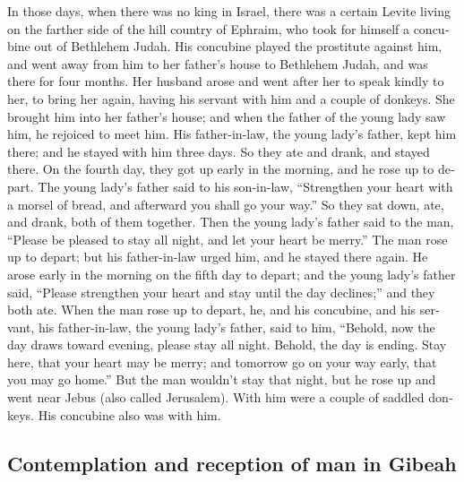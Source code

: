\begin{paracol}{2}
\begin{otherlanguage}{english}
 In those days, when there was no king in Israel, there
was a certain Levite living on the farther side of the hill country of
Ephraim, who took for himself a concubine out of Bethlehem Judah.
 His concubine played the prostitute against him, and went
away from him to her father's house to Bethlehem Judah, and was there
for four months.  Her husband arose and went after her to
speak kindly to her, to bring her again, having his servant with him and
a couple of donkeys. She brought him into her father's house; and when
the father of the young lady saw him, he rejoiced to meet him.
 His father-in-law, the young lady's father, kept him
there; and he stayed with him three days. So they ate and drank, and
stayed there.  On the fourth day, they got up early in the
morning, and he rose up to depart. The young lady's father said to his
son-in-law, ``Strengthen your heart with a morsel of bread, and
afterward you shall go your way.''  So they sat down, ate,
and drank, both of them together. Then the young lady's father said to
the man, ``Please be pleased to stay all night, and let your heart be
merry.''  The man rose up to depart; but his father-in-law
urged him, and he stayed there again.  He arose early in
the morning on the fifth day to depart; and the young lady's father
said, ``Please strengthen your heart and stay until the day declines;''
and they both ate.  When the man rose up to depart, he,
and his concubine, and his servant, his father-in-law, the young lady's
father, said to him, ``Behold, now the day draws toward evening, please
stay all night. Behold, the day is ending. Stay here, that your heart
may be merry; and tomorrow go on your way early, that you may go home.''
 But the man wouldn't stay that night, but he rose up and
went near Jebus (also called Jerusalem). With him were a couple of
saddled donkeys. His concubine also was with him.

\hypertarget{contemplation-and-reception-of-man-in-gibeah}{%
\subsection{Contemplation and reception of man in
Gibeah}\label{contemplation-and-reception-of-man-in-gibeah}}


\end{otherlanguage}
\end{paracol}
